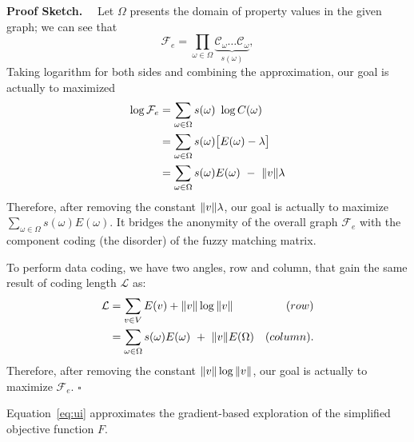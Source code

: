 \textbf{Proof Sketch.}~~
Let $\Omega$ presents the domain of property values in the given graph; we can see that 
\begin{equation*}
  \mathcal{F}_{e} = \prod_{\omega \in \Omega} \underbrace{\mathcal{C}_{\omega} \ldots \mathcal{C}_{\omega}}_{s(\omega)}, 
\end{equation*}
Taking logarithm for both sides and combining the approximation, our goal is actually to maximized 
\begin{align*}
  \log \mathcal{F}_{e} &= \sum_{\omega \in \Omega} s(\omega)~\log C(\omega) \\
                       &= \sum_{\omega \in \Omega} s(\omega) \big[ E(\omega) - \lambda \big] \\
                       &= \sum_{\omega \in \Omega} s(\omega) E(\omega) ~-~ \|v\| \lambda 
\end{align*}
Therefore, after removing the constant $\|v\|\lambda$, our goal is actually to maximize 
$\sum_{\omega \in \Omega} s(\omega) E(\omega)$. 
It bridges the anonymity of the overall graph $\mathcal{F}_{e}$ 
with the component coding (the disorder) of the fuzzy matching matrix. 

To perform data coding, we have two angles, row  and column, that gain the same result of coding length $\mathcal{L}$ as:
\begin{align*}
  \mathcal{L} &= \sum_{v \in V} E(v) + \|v\| \log \|v\|                             &(row)\\
              &= \sum_{\omega \in \Omega} s(\omega) E(\omega)~+~\|v\| E(\Omega) &(column). 
\end{align*}
Therefore, after removing the constant $\|v\| \log \|v\|$, our goal is actually to maximize 
$\mathcal{F}_{e}$. $\square$  

\begin{observation}
  Equation~\ref{eq:ui} approximates the gradient-based exploration of the simplified objective function $F$.
\end{observation}

